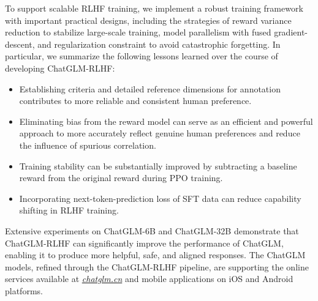 To support scalable RLHF training, we implement a robust training framework with important practical designs, including the strategies of reward variance reduction to stabilize large-scale training, model parallelism with fused gradient-descent, and regularization constraint to avoid catastrophic forgetting. 
In particular, we summarize the following lessons learned over the course of developing ChatGLM-RLHF: 
\begin{itemize}
\item Establishing criteria and detailed reference dimensions for annotation contributes to more reliable and consistent human preference.
\item Eliminating bias from the reward model can serve as an efficient and powerful approach to more accurately reflect genuine human preferences and reduce the influence of spurious correlation.
\item Training stability can be substantially improved by subtracting a baseline reward from the original reward during PPO training. 
\item Incorporating next-token-prediction loss of SFT data can reduce capability shifting in RLHF training. 
\end{itemize}

Extensive experiments on ChatGLM-6B and ChatGLM-32B demonstrate that ChatGLM-RLHF can significantly improve the performance of ChatGLM, enabling it to produce more helpful, safe, and aligned responses. 
The ChatGLM models, refined through the ChatGLM-RLHF pipeline, are supporting the online services available at \textit{\url{chatglm.cn}} and mobile applications on iOS and Android platforms. 


